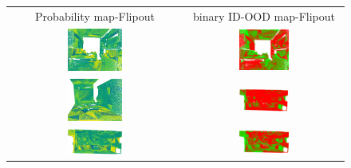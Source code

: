     \begin{figure}[h!]
        \centering
        \begin{tabular}{cc}
            Probability map-Flipout & binary ID-OOD map-Flipout \\
            \includegraphics[width=0.33\textwidth, height=0.18\textheight]{images/ood_imgs/fout_s3dis/ofc_3_fout_prob.pdf}& 
            \includegraphics[width=0.33\textwidth, height=0.18\textheight]{images/ood_imgs/fout_s3dis/fout_prob_2.pdf}\\

            \includegraphics[width=0.33\textwidth, height=0.18\textheight]{images/ood_imgs/fout_s3dis/cf1_fout_prob.pdf}& 
            \includegraphics[width=0.33\textwidth, height=0.18\textheight]{images/ood_imgs/fout_s3dis/fout_prob_4.pdf}\\

            \includegraphics[width=0.33\textwidth, height=0.18\textheight]{images/ood_imgs/fout_s3dis/pnt_1_fout_prob.pdf}& 
            \includegraphics[width=0.33\textwidth, height=0.18\textheight]{images/ood_imgs/fout_s3dis/fout_prob_3.pdf}\\


\end{tabular}
\end{figure}

